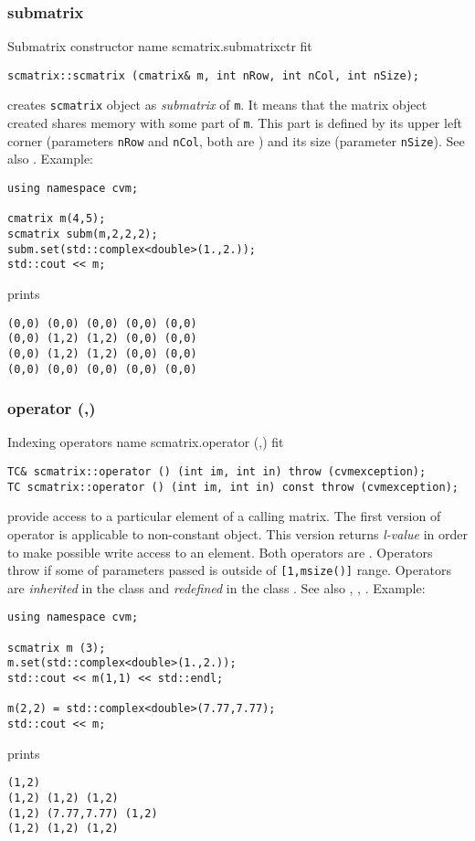 \subsubsection{submatrix}
Submatrix constructor%
\pdfdest name {scmatrix.submatrixctr} fit
\begin{verbatim}
scmatrix::scmatrix (cmatrix& m, int nRow, int nCol, int nSize);
\end{verbatim}
creates  \verb"scmatrix" object as  \emph{submatrix} of \verb"m".
It means that the matrix object created shares  memory with some part
of \verb"m". This part is defined by its upper left corner (parameters 
\verb"nRow" and \verb"nCol", both are \Based)
and its size (parameter \verb"nSize").
See also .
Example:
\begin{Verbatim}
using namespace cvm;

cmatrix m(4,5);
scmatrix subm(m,2,2,2);
subm.set(std::complex<double>(1.,2.));
std::cout << m;
\end{Verbatim}
prints
\begin{Verbatim}
(0,0) (0,0) (0,0) (0,0) (0,0)
(0,0) (1,2) (1,2) (0,0) (0,0)
(0,0) (1,2) (1,2) (0,0) (0,0)
(0,0) (0,0) (0,0) (0,0) (0,0)
\end{Verbatim}
\newpage




\subsubsection{operator (,)}
Indexing operators%
\pdfdest name {scmatrix.operator (,)} fit
\begin{verbatim}
TC& scmatrix::operator () (int im, int in) throw (cvmexception);
TC scmatrix::operator () (int im, int in) const throw (cvmexception);
\end{verbatim}
provide access to a particular element of a calling matrix. The first version
of  operator is applicable to  non-constant object.
This version returns \emph{l-value}
in order to make possible write access to an element.
Both operators are \Based.
Operators throw 
if some of parameters passed
is outside of \verb"[1,msize()]" range.
Operators are \emph{inherited}
in the class
and \emph{redefined}
in the class .
See also ,
,
.
Example:
\begin{Verbatim}
using namespace cvm;

scmatrix m (3);
m.set(std::complex<double>(1.,2.));
std::cout << m(1,1) << std::endl;

m(2,2) = std::complex<double>(7.77,7.77);
std::cout << m;
\end{Verbatim}
prints
\begin{Verbatim}
(1,2)
(1,2) (1,2) (1,2)
(1,2) (7.77,7.77) (1,2)
(1,2) (1,2) (1,2)
\end{Verbatim}
\newpage





